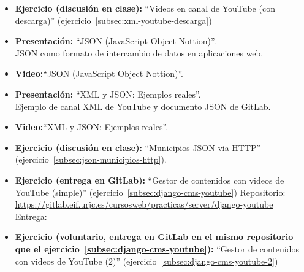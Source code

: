 \documentclass[a4paper,12pt]{article}
\begin{document}
\begin{itemize}
\item \textbf{Ejercicio (discusión en clase):} ``Videos en canal de YouTube (con descarga)'' (ejercicio~\ref{subsec:xml-youtube-descarga})
\item \textbf{Presentación:} ``JSON (JavaScript Object Nottion)''. \\
  JSON como formato de intercambio de datos en aplicaciones web.
\item \textbf{Video:}``JSON (JavaScript Object Nottion)''.
\item \textbf{Presentación:} ``XML y JSON: Ejemplos reales''. \\
  Ejemplo de canal XML de YouTube y documento JSON de GitLab.
\item \textbf{Video:}``XML y JSON: Ejemplos reales''.
\item \textbf{Ejercicio (discusión en clase):} ``Municipios JSON via HTTP'' (ejercicio~\ref{subsec:json-municipios-http}).
\item \textbf{Ejercicio (entrega en GitLab):} ``Gestor de contenidos con videos de YouTube (simple)'' (ejercicio~\ref{subsec:django-cms-youtube})
  Repositorio: \url{https://gitlab.eif.urjc.es/cursosweb/practicas/server/django-youtube} \\
  Entrega: \martesL
\item \textbf{Ejercicio (voluntario, entrega en GitLab en el mismo repositorio que el ejercicio~\ref{subsec:django-cms-youtube}):} ``Gestor de contenidos con videos de YouTube (2)'' (ejercicio~\ref{subsec:django-cms-youtube-2}) \\
\end{itemize}

\end{document}
